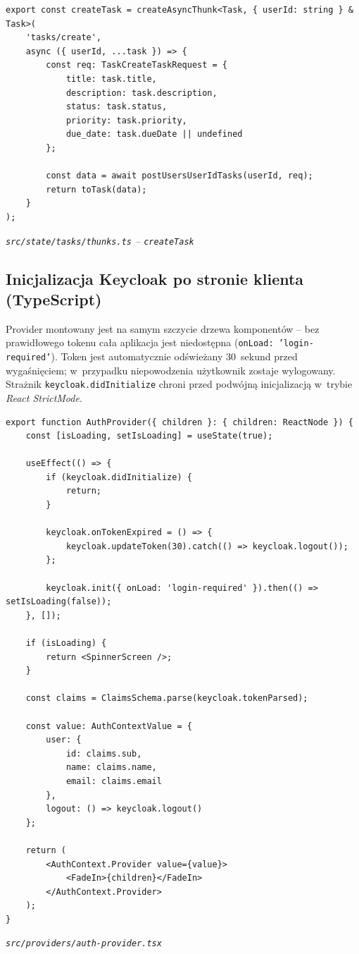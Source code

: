 \documentclass[12pt, a4paper, oneside]{article}
\newcommand{\codecaption}[1]{\par\vspace{-0.4em}\noindent\small\textit{#1}\par\vspace{0.3em}}
\begin{document}
\begin{verbatim}
export const createTask = createAsyncThunk<Task, { userId: string } & Task>(
    'tasks/create',
    async ({ userId, ...task }) => {
        const req: TaskCreateTaskRequest = {
            title: task.title,
            description: task.description,
            status: task.status,
            priority: task.priority,
            due_date: task.dueDate || undefined
        };

        const data = await postUsersUserIdTasks(userId, req);
        return toTask(data);
    }
);
\end{verbatim}
\codecaption{\texttt{src/state/tasks/thunks.ts} -- \texttt{createTask}}

\subsection{Inicjalizacja Keycloak po stronie klienta (TypeScript)}
Provider montowany jest na samym szczycie drzewa komponentów -- bez
prawidłowego tokenu cała aplikacja jest niedostępna
(\texttt{onLoad: 'login-required'}). Token jest automatycznie odświeżany
30~sekund przed wygaśnięciem; w~przypadku niepowodzenia użytkownik
zostaje wylogowany. Strażnik \texttt{keycloak.didInitialize} chroni
przed podwójną inicjalizacją w~trybie \emph{React StrictMode}.

\begin{verbatim}
export function AuthProvider({ children }: { children: ReactNode }) {
    const [isLoading, setIsLoading] = useState(true);

    useEffect(() => {
        if (keycloak.didInitialize) {
            return;
        }

        keycloak.onTokenExpired = () => {
            keycloak.updateToken(30).catch(() => keycloak.logout());
        };

        keycloak.init({ onLoad: 'login-required' }).then(() => setIsLoading(false));
    }, []);

    if (isLoading) {
        return <SpinnerScreen />;
    }

    const claims = ClaimsSchema.parse(keycloak.tokenParsed);

    const value: AuthContextValue = {
        user: {
            id: claims.sub,
            name: claims.name,
            email: claims.email
        },
        logout: () => keycloak.logout()
    };

    return (
        <AuthContext.Provider value={value}>
            <FadeIn>{children}</FadeIn>
        </AuthContext.Provider>
    );
}
\end{verbatim}
\codecaption{\texttt{src/providers/auth-provider.tsx}}
\end{document}
